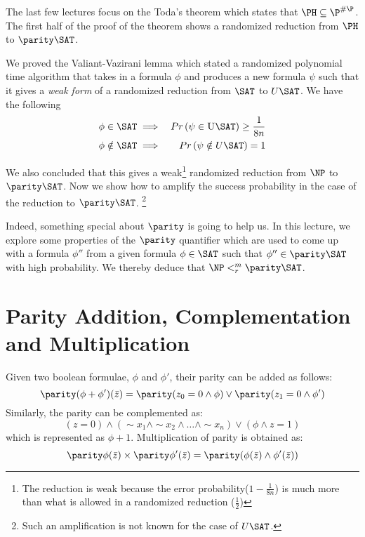 
The last few lectures focus on the Toda's theorem which states
that $\PH \subseteq \P^{\#\P}$. The first half of the proof of the theorem
shows a randomized reduction from $\PH$ to $\parity \SAT$. 

We proved the Valiant-Vazirani lemma which stated a randomized polynomial time algorithm that takes in a formula $\phi$ and produces a new formula $\psi$ such that it gives a {\em weak form} of a randomized reduction from $\SAT$ to $U\SAT$.  We have the following 
\begin{eqnarray*}
\phi \in \SAT & \implies & Pr \left( \psi \in \textrm{\sc U\SAT} \right) \ge \frac{1}{8n} \\
\phi \notin \SAT & \implies & Pr \left( \psi \notin {\sc U\SAT} \right) = 1
\end{eqnarray*}

We also concluded that this gives a weak\footnote{The reduction is weak because the error probability($1-\frac{1}{8n}$) is much more than what is allowed in a randomized reduction ($\frac{1}{2}$)} randomized reduction from $\NP$ to $\parity\SAT$.  Now we show how to amplify the success probability in the case of the reduction to $\parity \SAT$. \footnote{Such an amplification is not known for the case of $U\SAT$.}

Indeed, something special about $\parity$ is going to help us. In this lecture, we explore some properties of the $\parity$ quantifier which are used to come up with a formula $\phi''$ from a given formula $\phi \in \SAT $ such that $\phi'' \in \parity \SAT$ with high probability. We thereby deduce that $\NP <^m_r \parity \SAT$.

\section{Parity Addition, Complementation and Multiplication}
Given two boolean formulae, $\phi $ and $\phi'$, their parity can be added as follows: 
\[\parity(\phi + \phi')(\bar z) = \parity(z_0 = 0 \wedge \phi) \vee \parity(z_1 = 0 \wedge \phi')  \]
Similarly, the parity can be complemented as: 
\[(z= 0 )\wedge (\sim x_1 \wedge \sim x_2 \wedge \ldots \wedge \sim x_n ) \vee (\phi \wedge z = 1)\]
which is represented as $\phi + 1$.
Multiplication of parity is obtained as: 
\[\parity \phi(\bar z) \times \parity \phi'(\bar z) = \parity (\phi(\bar z) \wedge \phi'(\bar z)) \]
